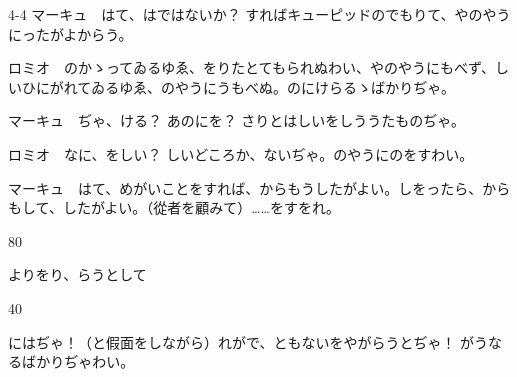 \documentclass[tate,paper=b6j,jafontsize=9pt]{jlreq}
\begin{document}
\begin{azconvIndented}{4\zw}{-4\zw}
マーキュ　はて、はではないか？ すればキューピッドのでもりて、やのやうにったがよからう。

ロミオ　のかゝってゐるゆゑ、をりたとてもられぬわい、やのやうにもべず、しいひにがれてゐるゆゑ、のやうにうもべぬ。のにけらるゝばかりぢゃ。

マーキュ　ぢゃ、ける？ あのにを？ さりとはしいをしううたものぢゃ。

ロミオ　なに、をしい？ しいどころか、ないぢゃ。のやうにのをすわい。

マーキュ　はて、めがいことをすれば、からもうしたがよい。しをったら、からもして、したがよい。（從者を顧みて）……をすをれ。

\end{azconvIndented}
\begin{azconvIndented}{8\zw}{0\zw}

よりをり、らうとして

\end{azconvIndented}
\begin{azconvIndented}{4\zw}{0\zw}

にはぢゃ！（と假面をしながら）れがで、ともないをやがらうとぢゃ！ がうなるばかりぢゃわい。

\end{azconvIndented}
\end{document}

